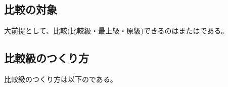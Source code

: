 \enlargethispage{2.5\baselineskip}
\makeatletter
\renewcommand{\compareexrow}[2]{%
  \par\vspace{0.28em}%
  \noindent
  \begin{tabular}[t]{@{}p{\compareexwd}@{\hspace{\compareexgap}}p{\compareexwd}@{}}#1 & #2 \\ \end{tabular}%
  \par\vspace{0.12em}%
}
\renewcommand{\dialogueblankprac}[1]{%
  \par\vspace{0.2em}%
  \noindent
  \ifshowanswer
    \fitblank@withspaces{\underline{\makebox[\linewidth][l]{\hspace{0.35em}{\color{blue}#1}\hspace{0.35em}}}}%
  \else
    \fitblank@withspaces{\underline{\makebox[\linewidth][l]{\hspace{0.35em}{\phantom{#1}}\hspace{0.35em}}}}%
  \fi
  \par\vspace{0.24em}%
}
\makeatother
\subsection{比較の対象}\vspace{-0.2em}
    大前提として、比較(比較級・最上級・原級)できるのはまたはである。

\subsection{比較級のつくり方}\vspace{-0.2em}
    比較級のつくり方は以下のである。

